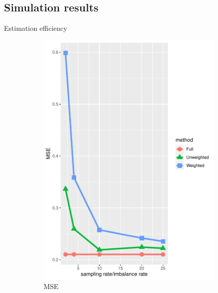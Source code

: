 \documentclass{beamer}
\begin{document}
\subsection{Simulation results}
    \begin{frame}{Estimation efficiency}
    \begin{figure}
	\centering
	\begin{subfigure}{0.47\textwidth}
		\includegraphics[width=\textwidth]{mse2.pdf}
		\caption{MSE}
	\end{subfigure}
	\begin{subfigure}{0.47\textwidth}

\end{subfigure}
\end{figure}
\end{frame}
\end{document}

